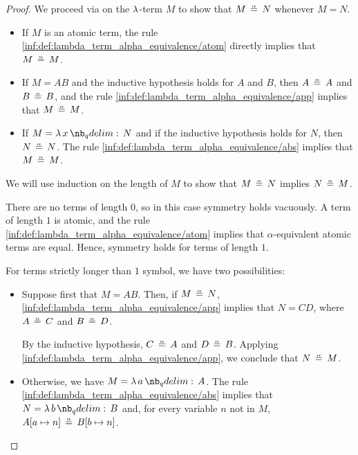 \begin{proof}

   We proceed via  on the \( \mathrm{\lambda} \)-term \( M \) to show that \( M \aequiv N \) whenever \( M = N \).
  \begin{itemize}
    \item If \( M \) is an atomic term, the rule \ref{inf:def:lambda_term_alpha_equivalence/atom} directly implies that \( M \aequiv M \).
    \item If \( M = AB \) and the inductive hypothesis holds for \( A \) and \( B \), then \( A \aequiv A \) and \( B \aequiv B \), and the rule \ref{inf:def:lambda_term_alpha_equivalence/app} implies that \( M \aequiv M \).
    \item If \( M = \qabs x N \) and if the inductive hypothesis holds for \( N \), then \( N \aequiv N \). The rule \ref{inf:def:lambda_term_alpha_equivalence/abs} implies that \( M \aequiv M \).
  \end{itemize}

   We will use induction on the length of \( M \) to show that \( M \aequiv N \) implies \( N \aequiv M \).

  There are no terms of length \( 0 \), so in this case symmetry holds vacuously. A term of length \( 1 \) is atomic, and the rule \ref{inf:def:lambda_term_alpha_equivalence/atom} implies that \( \alpha \)-equivalent atomic terms are equal. Hence, symmetry holds for terms of length \( 1 \).

  For terms strictly longer than \( 1 \) symbol, we have two possibilities:
  \begin{itemize}
    \item Suppose first that \( M = AB \). Then, if \( M \aequiv N \), \ref{inf:def:lambda_term_alpha_equivalence/app} implies that \( N = CD \), where \( A \aequiv C \) and \( B \aequiv D \).

    By the inductive hypothesis, \( C \aequiv A \) and \( D \aequiv B \). Applying \ref{inf:def:lambda_term_alpha_equivalence/app}, we conclude that \( N \aequiv M \).

    \item Otherwise, we have \( M = \qabs a A \). The rule \ref{inf:def:lambda_term_alpha_equivalence/abs} implies that \( N = \qabs b B \) and, for every variable \( n \) not in \( M \), \( A[a \mapsto n] \aequiv B[b \mapsto n] \).


\end{itemize}
\end{proof}
